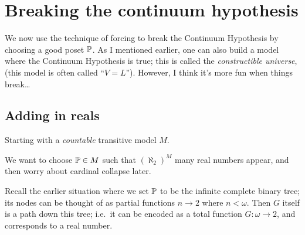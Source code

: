 \chapter{Breaking the continuum hypothesis}
We now use the technique of forcing to break the
Continuum Hypothesis by choosing a good poset $\mathbb P$.
As I mentioned earlier, one can also build a model
where the Continuum Hypothesis is true;
this is called the \emph{constructible universe},
(this model is often called ``$V=L$'').
However, I think it's more fun when things break\dots

%
%

\section{Adding in reals}
Starting with a \emph{countable} transitive model $M$.

We want to choose $\mathbb P \in M$ such that $(\aleph_2)^M$ many real numbers appear,
and then worry about cardinal collapse later.

Recall the earlier situation where we set $\mathbb P$ to be the infinite complete binary tree; its nodes can be thought of as partial functions $n \to 2$ where $n < \omega$.
Then $G$ itself is a path down this tree; i.e.\ it can be encoded as a total function $G \colon \omega \to 2$,
and corresponds to a real number.

